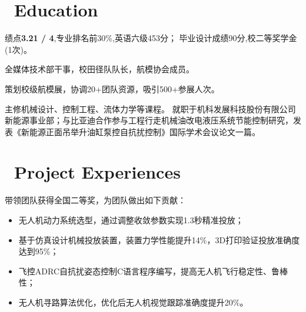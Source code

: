 \documentclass{resume}
\begin{document}

 



  



\section{\faGraduationCap\  Education}
  
绩点\textbf{3.21 / 4},专业排名前30\%,英语六级453分；
毕业设计成绩90分,校二等奖学金(1次)。

全媒体技术部干事，校田径队队长，航模协会成员。

策划校级航模展，协调20+团队资源，吸引500+参展人次。

主修机械设计、控制工程、流体力学等课程。
就职于机科发展科技股份有限公司新能源事业部；与比亚迪合作参与工程行走机械油改电液压系统节能控制研究，发表《新能源正面吊举升油缸泵控自抗扰控制》国际学术会议论文一篇。








\section{\faListUl\ Project Experiences}

  带领团队获得全国二等奖，为团队做出如下贡献：
\begin{itemize}[parsep=0.5ex,label=]
  \item 无人机动力系统选型，通过调整收敛参数实现1.3秒精准投放；
  \item 基于仿真设计机械投放装置，装置力学性能提升14\%，3D打印验证投放准确度达到95\%；
  \item 飞控ADRC自抗扰姿态控制C语言程序编写，提高无人机飞行稳定性、鲁棒性；
  \item 无人机寻路算法优化，优化后无人机视觉跟踪准确度提升20\%。
\end{itemize}
\end{document}
